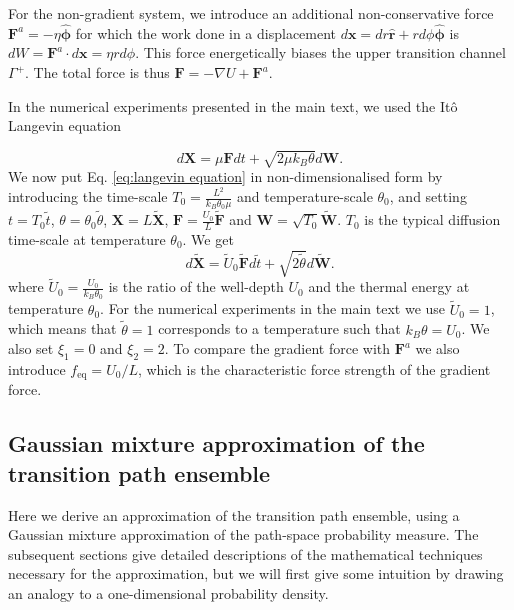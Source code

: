 For the non-gradient system, we introduce an additional non-conservative
force $\mathbf{F}^{a}=-\eta\hat{\boldsymbol{\phi}}$ for which the
work done in a displacement $d\mathbf{x}=dr\hat{\mathbf{r}}+rd\phi\hat{\boldsymbol{\phi}}$
is $dW=\mathbf{F}^{a}\cdot d\mathbf{x}=\eta rd\phi$. This force energetically
biases the upper transition channel $\Gamma^{+}$. The total force
is thus $\mathbf{F}=-\nabla U+\mathbf{F}^{a}$.

In the numerical experiments presented in the main text, we used the
Itô Langevin equation 

\begin{equation}
d\mathbf{X}=\mu\mathbf{F}dt+\sqrt{2\mu k_{B}\theta}d\mathbf{W}.\label{eq:langevin equation}
\end{equation}
We now put Eq. \ref{eq:langevin equation} in non-dimensionalised
form by introducing the time-scale $T_{0}=\frac{L^{2}}{k_{B}\theta_{0}\mu}$
and temperature-scale $\theta_{0}$, and setting $t=T_{0}\tilde{t}$,
$\theta=\theta_{0}\tilde{\theta}$, $\mathbf{X}=L\tilde{\mathbf{X}}$,
$\mathbf{F}=\frac{U_{0}}{L}\tilde{\mathbf{F}}$ and $\mathbf{W}=\sqrt{T_{0}}\tilde{\mathbf{W}}.$
$T_{0}$ is the typical diffusion time-scale at temperature $\theta_{0}$.
We get
\[
d\mathbf{\tilde{X}}=\tilde{U}_{0}\tilde{\mathbf{F}}d\tilde{t}+\sqrt{2\tilde{\theta}}d\tilde{\mathbf{W}}.
\]
where $\tilde{U}_{0}=\frac{U_{0}}{k_{B}\theta_{0}}$ is the ratio
of the well-depth $U_{0}$ and the thermal energy at temperature $\theta_{0}$.
For the numerical experiments in the main text  we use $\tilde{U}_{0}=1$,
which means that $\tilde{\theta}=1$ corresponds to a temperature
such that $k_{B}\theta=U_{0}$. We also set $\xi_{1}=0$ and $\xi_{2}=2$.
To compare the gradient force with $\mathbf{F}^{a}$ we also introduce
$f_{\text{eq}}=U_{0}/L$, which is the characteristic force strength
of the gradient force.



\subsection{Gaussian mixture approximation of the transition path ensemble}

Here we derive an approximation of the transition path ensemble, using
a Gaussian mixture approximation of the path-space probability measure.
The subsequent sections give detailed descriptions of the mathematical
techniques necessary for the approximation, but we will first give
some intuition by drawing an analogy to a one-dimensional probability
density.

